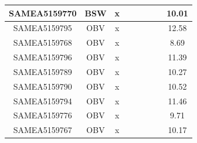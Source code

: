 \documentclass[../main.tex]{subfiles}
\begin{document}
\begin{flushleft}
\begin{footnotesize}
\begin{longtable}{|c|c|c|c|c|c|c|}
    \hline
    SAMEA5159770  & BSW   & x                                                            & ~          & ~                                                                           & ~                                                                 & 10.01     \\ 
    \hline
    SAMEA5159795  & OBV   & x                                                            & ~          & ~                                                                           & ~                                                                 & 12.58     \\ 
    \hline
    SAMEA5159768  & OBV   & x                                                            & ~          & ~                                                                           & ~                                                                 & 8.69      \\ 
    \hline
    SAMEA5159796  & OBV   & x                                                            & ~          & ~                                                                           & ~                                                                 & 11.39     \\ 
    \hline
    SAMEA5159789  & OBV   & x                                                            & ~          & ~                                                                           & ~                                                                 & 10.27     \\ 
    \hline
    SAMEA5159790  & OBV   & x                                                            & ~          & ~                                                                           & ~                                                                 & 10.52     \\ 
    \hline
    SAMEA5159794  & OBV   & x                                                            & ~          & ~                                                                           & ~                                                                 & 11.46     \\ 
    \hline
    SAMEA5159776  & OBV   & x                                                            & ~          & ~                                                                           & ~                                                                 & 9.71      \\ 
    \hline
    SAMEA5159767  & OBV   & x                                                            & ~          & ~                                                                           & ~                                                                 & 10.17     \\ 

\end{longtable}
\end{footnotesize}
\end{flushleft}
\end{document}
